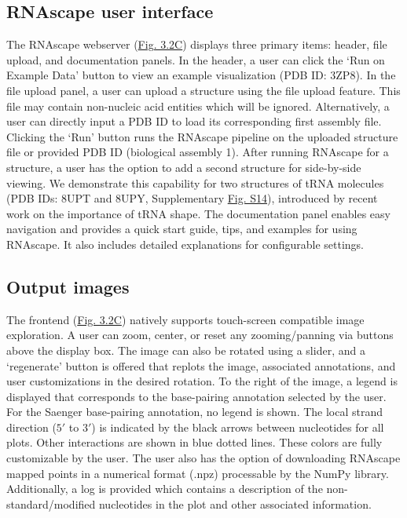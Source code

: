 \subsection{RNAscape user interface}

The RNAscape webserver (\hyperref[fig:rnascape2]{Fig. 3.2C}) displays three primary items: header, file upload, and documentation panels. In the header, a user can click the ‘Run on Example Data’ button to view an example visualization (PDB ID: 3ZP8). In the file upload panel, a user can upload a structure using the file upload feature. This file may contain non-nucleic acid entities which will be ignored. Alternatively, a user can directly input a PDB ID to load its corresponding first assembly file. Clicking the ‘Run’ button runs the RNAscape pipeline on the uploaded structure file or provided PDB ID (biological assembly 1). After running RNAscape for a structure, a user has the option to add a second structure for side-by-side viewing. We demonstrate this capability for two structures of tRNA molecules (PDB IDs: 8UPT and 8UPY, Supplementary \hyperref[fig:rnascapeS2]{Fig. S14}), introduced by recent work \citep{Krahn2024} on the importance of tRNA shape. The documentation panel enables easy navigation and provides a quick start guide, tips, and examples for using RNAscape. It also includes detailed explanations for configurable settings.

\subsection{Output images}

The frontend (\hyperref[fig:rnascape2]{Fig. 3.2C}) natively supports touch-screen compatible image exploration. A user can zoom, center, or reset any zooming/panning via buttons above the display box. The image can also be rotated using a slider, and a ‘regenerate’ button is offered that replots the image, associated annotations, and user customizations in the desired rotation. To the right of the image, a legend is displayed that corresponds to the base-pairing annotation selected by the user. For the Saenger \citep{Saenger1984} base-pairing annotation, no legend is shown. The local strand direction ($5'$ to $3'$) is indicated by the black arrows between nucleotides for all plots. Other interactions are shown in blue dotted lines. These colors are fully customizable by the user. The user also has the option of downloading RNAscape mapped points in a numerical format (.npz) processable by the NumPy \citep{harris2020array} library. Additionally, a log is provided which contains a description of the non-standard/modified nucleotides in the plot and other associated information.

